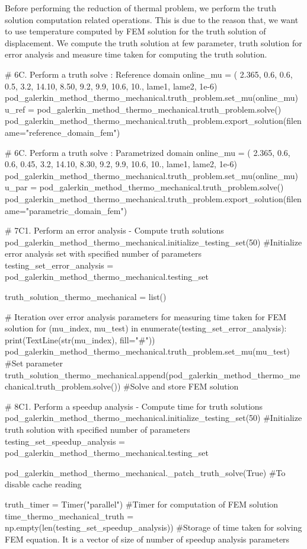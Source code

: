 Before performing the reduction of thermal problem, we perform the truth solution computation related operations. This is due to the reason that, we want to use temperature computed by FEM solution for the truth solution of displacement.
We compute the truth solution at few parameter, truth solution for error analysis and measure time taken for computing the truth solution.
\begin{python}
# 6C. Perform a truth solve : Reference domain
online_mu = ( 2.365, 0.6, 0.6, 0.5, 3.2, 14.10, 8.50, 9.2, 9.9, 10.6, 10., lame1, lame2, 1e-6)
pod_galerkin_method_thermo_mechanical.truth_problem.set_mu(online_mu)
u_ref = pod_galerkin_method_thermo_mechanical.truth_problem.solve()
pod_galerkin_method_thermo_mechanical.truth_problem.export_solution(filename="reference_domain_fem")

# 6C. Perform a truth solve : Parametrized domain
online_mu = ( 2.365, 0.6, 0.6, 0.45, 3.2, 14.10, 8.30, 9.2, 9.9, 10.6, 10., lame1, lame2, 1e-6)
pod_galerkin_method_thermo_mechanical.truth_problem.set_mu(online_mu)
u_par = pod_galerkin_method_thermo_mechanical.truth_problem.solve()
pod_galerkin_method_thermo_mechanical.truth_problem.export_solution(filename="parametric_domain_fem")

# 7C1. Perform an error analysis - Compute truth solutions
pod_galerkin_method_thermo_mechanical.initialize_testing_set(50) #Initialize error analysis set with specified number of parameters
testing_set_error_analysis = pod_galerkin_method_thermo_mechanical.testing_set 

truth_solution_thermo_mechanical = list()

# Iteration over error analysis parameters for measuring time taken for FEM solution
for (mu_index, mu_test) in enumerate(testing_set_error_analysis):
	print(TextLine(str(mu_index), fill="#"))
	pod_galerkin_method_thermo_mechanical.truth_problem.set_mu(mu_test) #Set parameter
	truth_solution_thermo_mechanical.append(pod_galerkin_method_thermo_mechanical.truth_problem.solve()) #Solve and store FEM solution

# 8C1. Perform a speedup analysis - Compute time for truth solutions
pod_galerkin_method_thermo_mechanical.initialize_testing_set(50) #Initialize truth solution with specified number of parameters
testing_set_speedup_analysis = pod_galerkin_method_thermo_mechanical.testing_set

pod_galerkin_method_thermo_mechanical._patch_truth_solve(True) #To disable cache reading

truth_timer = Timer("parallel") #Timer for computation of FEM solution
time_thermo_mechanical_truth = np.empty(len(testing_set_speedup_analysis)) #Storage of time taken for solving FEM equation. It is a vector of size of number of speedup analysis parameters


\end{python}
